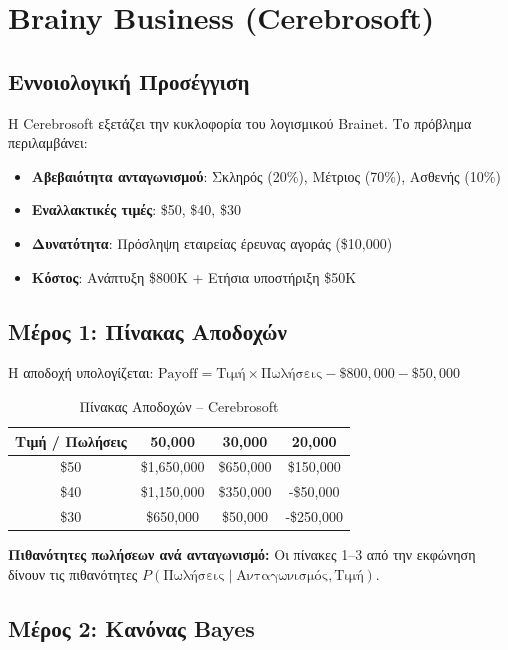 \documentclass[a4paper,12pt]{article}
\begin{document}
\section{Brainy Business (Cerebrosoft)}

\subsection{Εννοιολογική Προσέγγιση}

Η Cerebrosoft εξετάζει την κυκλοφορία του λογισμικού Brainet. Το πρόβλημα περιλαμβάνει:
\begin{itemize}
    \item \textbf{Αβεβαιότητα ανταγωνισμού}: Σκληρός (20\%), Μέτριος (70\%), Ασθενής (10\%)
    \item \textbf{Εναλλακτικές τιμές}: \$50, \$40, \$30
    \item \textbf{Δυνατότητα}: Πρόσληψη εταιρείας έρευνας αγοράς (\$10,000)
    \item \textbf{Κόστος}: Ανάπτυξη \$800K + Ετήσια υποστήριξη \$50K
\end{itemize}

\subsection{Μέρος 1: Πίνακας Αποδοχών}

Η αποδοχή υπολογίζεται: $\text{Payoff} = \text{Τιμή} \times \text{Πωλήσεις} - \$800{,}000 - \$50{,}000$

\begin{table}[H]
\centering
\begin{tabular}{c|ccc}
\toprule
\textbf{Τιμή / Πωλήσεις} & \textbf{50,000} & \textbf{30,000} & \textbf{20,000} \\
\midrule
\$50 & \$1,650,000 & \$650,000 & \$150,000 \\
\$40 & \$1,150,000 & \$350,000 & -\$50,000 \\
\$30 & \$650,000 & \$50,000 & -\$250,000 \\
\bottomrule
\end{tabular}
\caption{Πίνακας Αποδοχών -- Cerebrosoft}
\end{table}

\textbf{Πιθανότητες πωλήσεων ανά ανταγωνισμό:} Οι πίνακες 1--3 από την εκφώνηση δίνουν τις πιθανότητες $P(\text{Πωλήσεις} \mid \text{Ανταγωνισμός}, \text{Τιμή})$.

\subsection{Μέρος 2: Κανόνας Bayes}
\end{document}
